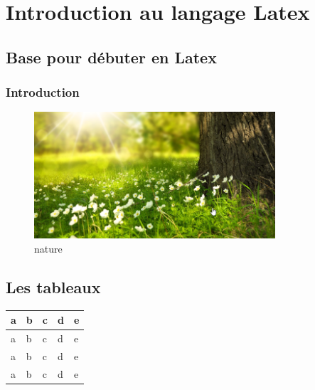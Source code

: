 \documentclass{report}
\begin{document}
\tableofcontents
\part{Introduction au langage Latex}
\chapter{Base pour débuter en Latex}
\section{Introduction}
\lipsum[1-2]
\begin{figure}
    \centering
    \includegraphics[width=0.8\textwidth]{nature.png}
    \caption{nature}
\end{figure}

\chapter{Les tableaux}
\lipsum[1 - 2]
\begin{table}
    \centering
    \begin{tabular}{|l|l|l|l|l|}
        \hline 
        a & b & c & d & e \\
        \hline 
        a & b & c & d & e \\
        \hline 
        a & b & c & d & e \\
        \hline 
        a & b & c & d & e \\
        \hline
    \end{tabular}
\end{table}
\end{document}
